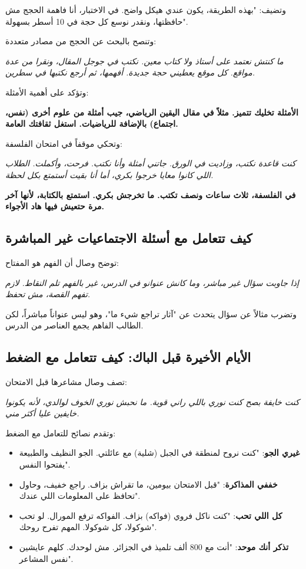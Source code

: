 \documentclass[12pt,a4paper]{book}
\newcommand{\quoteAr}[1]{%
	\begin{myquote}
		\itshape #1
	\end{myquote}
}
\newcommand{\importantAr}[1]{%
	\begin{important}
		\bfseries #1
	\end{important}
}
\begin{document}
	وتضيف: "بهذه الطريقة، يكون عندي هيكل واضح. في الاختبار، أنا فاهمة الحجج مش حافظتها، ونقدر نوسع كل حجة في 10 أسطر بسهولة".
	
	وتنصح بالبحث عن الحجج من مصادر متعددة:
	
	\quoteAr{ما كنتش نعتمد على أستاذ ولا كتاب معين. نكتب في جوجل المقال، ونقرا من عدة مواقع. كل موقع يعطيني حجة جديدة. أفهمها، ثم أرجع نكتبها في سطرين.}
	
	وتؤكد على أهمية الأمثلة:
	
	\importantAr{الأمثلة تخليك تتميز. مثلاً في مقال اليقين الرياضي، جيب أمثلة من علوم أخرى (نفس، اجتماع) بالإضافة للرياضيات. استغل ثقافتك العامة.}
	
	وتحكي موقفاً في امتحان الفلسفة:
	
	\quoteAr{كنت قاعدة نكتب، وزاديت في الورق. جاتني أمثلة وأنا نكتب. فرحت، وأكملت. الطلاب اللي كانوا معايا خرجوا بكري، أما أنا بقيت أستمتع بكل لحظة.}
	
	\importantAr{في الفلسفة، ثلاث ساعات ونصف تكتب. ما تخرجش بكري. استمتع بالكتابة، لأنها آخر مرة حتعيش فيها هاد الأجواء.}
	
	\subsection{كيف تتعامل مع أسئلة الاجتماعيات غير المباشرة}
	
	توضح وصال أن الفهم هو المفتاح:
	
	\quoteAr{إذا جاوبت سؤال غير مباشر، وما كانش عنوانو في الدرس، غير بالفهم تلم النقاط. لازم تفهم القصة، مش تحفظ.}
	
	وتضرب مثالاً عن سؤال يتحدث عن "آثار تراجع شيء ما"، وهو ليس عنواناً مباشراً، لكن الطالب الفاهم يجمع العناصر من الدرس.
	
	\subsection{الأيام الأخيرة قبل الباك: كيف تتعامل مع الضغط}
	\label{sec:random-tips23}
	
	تصف وصال مشاعرها قبل الامتحان:
	
	\quoteAr{كنت خايفة بصح كنت نوري باللي راني قوية. ما نحبش نوري الخوف لوالدي، لأنه يكونوا خايفين عليا أكثر مني.}
	
	وتقدم نصائح للتعامل مع الضغط:
	
	\begin{itemize}
		\item \textbf{غيري الجو}: "كنت نروح لمنطقة في الجبل (شلية) مع عائلتي. الجو النظيف والطبيعة يفتحوا النفس".
		\item \textbf{خففي المذاكرة}: "قبل الامتحان بيومين، ما تقراش بزاف. راجع خفيف، وحاول تحافظ على المعلومات اللي عندك".
		\item \textbf{كل اللي تحب}: "كنت ناكل فروي (فواكه) بزاف. الفواكه ترفع المورال. لو تحب شوكولا، كل شوكولا. المهم تفرح روحك".
		\item \textbf{تذكر أنك موحد}: "أنت مع 800 ألف تلميذ في الجزائر. مش لوحدك. كلهم عايشين نفس المشاعر".
	\end{itemize}
	
\end{document}
